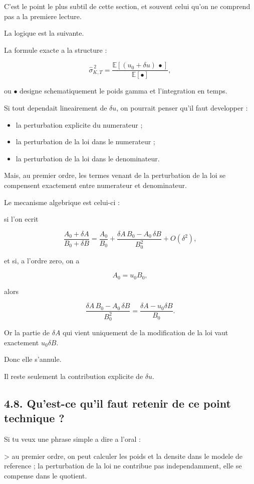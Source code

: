 \documentclass[11pt,a4paper]{article}
\begin{document}
C'est le point le plus subtil de cette section, et souvent celui qu'on ne comprend pas a la premiere lecture.

La logique est la suivante.

La formule exacte a la structure :

\[
\widehat{\sigma}_{K,T}^{\,2}
=
\frac{\mathbb E[(u_0+\delta u)\,\bullet]}{\mathbb E[\bullet]},
\]

ou \(\bullet\) designe schematiquement le poids gamma et l'integration en temps.

Si tout dependait lineairement de \(\delta u\), on pourrait penser qu'il faut developper :

\begin{itemize}
\item la perturbation explicite du numerateur ;
\item la perturbation de la loi dans le numerateur ;
\item la perturbation de la loi dans le denominateur.
\end{itemize}

Mais, au premier ordre, les termes venant de la perturbation de la loi se compensent exactement entre numerateur et denominateur.

Le mecanisme algebrique est celui-ci :

si l'on ecrit

\[
\frac{A_0+\delta A}{B_0+\delta B}
=
\frac{A_0}{B_0}
+
\frac{\delta A\,B_0-A_0\,\delta B}{B_0^2}
+
O(\delta^2),
\]

et si, a l'ordre zero, on a

\[
A_0=u_0 B_0,
\]

alors

\[
\frac{\delta A\,B_0-A_0\,\delta B}{B_0^2}
=
\frac{\delta A-u_0\delta B}{B_0}.
\]

Or la partie de \(\delta A\) qui vient uniquement de la modification de la loi vaut exactement \(u_0\delta B\).

Donc elle s'annule.

Il reste seulement la contribution explicite de \(\delta u\).

\subsection{4.8. Qu'est-ce qu'il faut retenir de ce point technique ?}

Si tu veux une phrase simple a dire a l'oral :

> au premier ordre, on peut calculer les poids et la densite dans le modele de reference ; la perturbation de la loi ne contribue pas independamment, elle se compense dans le quotient.
\end{document}
